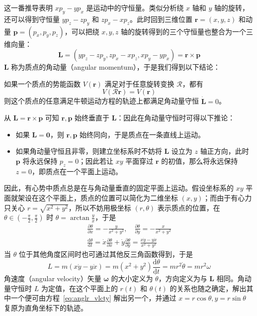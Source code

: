 \documentclass[cn,10pt,math=newtx,citestyle=gb7714-2015,bibstyle=gb7714-2015]{elegantbook}
\def\bm{\boldsymbol}
\def\mc{\mathcal}
\def\d{\mathrm d}
\def\p{\partial}
\begin{document}
这一番推导表明 $xp_y-yp_x$ 是运动中的守恒量。类似分析绕 $x$ 轴和 $y$ 轴的旋转，还可以得到守恒量 $yp_z-zp_y$ 和 $zp_x-xp_z$。此时回到三维位置 $\bm r=(x,y,z)$ 和动量 $\bm p=(p_x,p_y,p_z)$，可以把绕 $x,y,z$ 轴的旋转得到的三个守恒量也整合为一个三维向量：
\begin{equation*}
    \bm L=(yp_z-zp_y,zp_x-xp_z,xp_y-yp_x)=\bm r\times\bm p
\end{equation*}
$\bm L$ 称为质点的角动量（angular momentum），于是我们得到以下结论：
\begin{theorem}[角动量守恒定律-v1]
    如果一个质点的势能函数 $V(\bm r)$ 满足对于任意旋转变换 $\mc R$，都有
    \begin{equation*}
        V(\mc R\bm r)=V(\bm r)
    \end{equation*}
    则这个质点的任意满足牛顿运动方程的轨迹上都满足角动量守恒 $\dot{\bm L}=0$。
\end{theorem}

从 $\bm L=\bm r\times\bm p$ 可知 $\bm r,\bm p$ 始终垂直于 $\bm L$：因此在角动量守恒时可得以下推论：
\begin{itemize}
    \item 如果 $\bm L=\bm 0$，则 $\bm r,\bm p$ 始终同向，于是质点在一条直线上运动。
    \item 如果角动量守恒且非零，则建立坐标系时不妨将 $\bm L$ 设立为 $z$ 轴正方向，此时 $\bm p$ 将永远保持 $p_z=0$；因此若让 $xy$ 平面穿过 $\bm r$ 的初值，那么将永远保持 $z=0$，即质点在一个平面上运动。
\end{itemize}
因此，有心势中质点总是在与角动量垂直的固定平面上运动。假设坐标系的 $xy$ 平面就架设在这个平面上，质点的位置可以简化为二维坐标 $(x,y)$；而由于有心力只关心 $r=\sqrt{x^2+y^2}$，所以不妨用极坐标 $(r,\theta)$ 表示质点的位置，在 $\theta\in\left(-\frac{\pi}{2},\frac{\pi}{2}\right)$ 时 $\theta = \arctan\frac{y}{x}$，于是
\begin{gather*}
    \frac{\p\theta}{\p x}=-\frac{y}{x^2+y^2},\quad \frac{\p\theta}{\p y}=-\frac{x}{x^2+y^2}\\
    \frac{\d\theta}{\d t} = \dot{x}\frac{\p\theta}{\p x} + \dot{y}\frac{\p\theta}{\p y}=\frac{x\dot y-y\dot x}{x^2+y^2}
\end{gather*}
当 $\theta$ 位于其他角度区间时也可通过其他反三角函数得到，于是
\begin{equation}\label{eq:anglr_vlcty}
    L=m(x\dot y - y\dot x)=m(x^2+y^2)\frac{\d\theta}{\d t}=mr^2\dot\theta=mr^2\omega
\end{equation}
角速度（angular velocity）矢量 $\bm \omega$ 的大小定义为 $\dot{\theta}$，方向定义为与 $\bm L$ 相同。角动量守恒时 $L$ 为定值，在这个平面上的 $r(t)$ 和 $\theta(t)$ 的关系也随之确定，解出其中一个便可由方程~\ref{eq:anglr_vlcty} 解出另一个，并通过 $x=r\cos\theta,y=r\sin\theta$ 复原为直角坐标下的轨迹。
\end{document}
